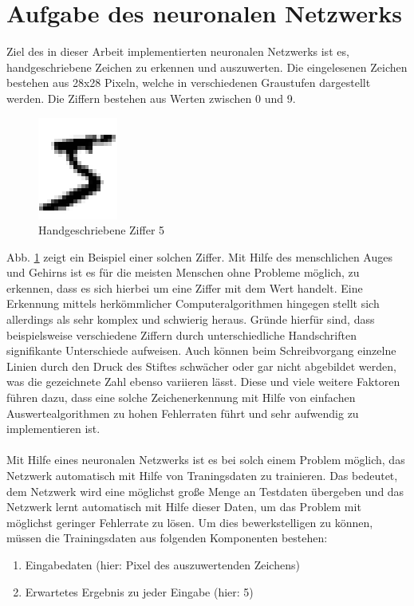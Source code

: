 \section{Aufgabe des neuronalen Netzwerks}
Ziel des in dieser Arbeit implementierten neuronalen Netzwerks ist es, handgeschriebene Zeichen zu erkennen und auszuwerten. Die eingelesenen Zeichen bestehen aus 28x28 Pixeln, welche in verschiedenen Graustufen dargestellt werden. Die Ziffern bestehen aus Werten zwischen 0 und 9. 
\begin{figure}[hbt]
	\centering
	\includegraphics[scale=0.6]{Bilder/handdrawn_digit}
	\caption{Handgeschriebene Ziffer 5 \cite{nielson:2017}} 
	\label{fig:handwritten_digit_5} 
\end{figure}
Abb. \ref{fig:handwritten_digit_5} zeigt ein Beispiel einer solchen Ziffer. Mit Hilfe des menschlichen Auges und Gehirns ist es für die meisten Menschen ohne Probleme möglich, zu erkennen, dass es sich hierbei um eine Ziffer mit dem Wert \grqq handelt. Eine Erkennung mittels herkömmlicher Computeralgorithmen hingegen stellt sich allerdings als sehr komplex und schwierig heraus. Gründe hierfür sind, dass beispielsweise verschiedene Ziffern durch unterschiedliche Handschriften signifikante Unterschiede aufweisen. Auch können beim Schreibvorgang einzelne Linien durch den Druck des Stiftes schwächer oder gar nicht abgebildet werden, was die gezeichnete Zahl ebenso variieren lässt. Diese und viele weitere Faktoren führen dazu, dass eine solche Zeichenerkennung mit Hilfe von einfachen Auswertealgorithmen zu hohen Fehlerraten führt und sehr aufwendig zu implementieren ist. \\ \\
Mit Hilfe eines neuronalen Netzwerks ist es bei solch einem Problem möglich, das Netzwerk automatisch mit Hilfe von Traningsdaten zu trainieren. Das bedeutet, dem Netzwerk wird eine möglichst große Menge an Testdaten übergeben und das Netzwerk lernt automatisch mit Hilfe dieser Daten, um das Problem mit möglichst geringer Fehlerrate zu lösen. Um dies bewerkstelligen zu können, müssen die Trainingsdaten aus folgenden Komponenten bestehen:
\begin{enumerate}
\item Eingabedaten (hier: Pixel des auszuwertenden Zeichens)
\item Erwartetes Ergebnis zu jeder Eingabe (hier: 5)
\end{enumerate}

